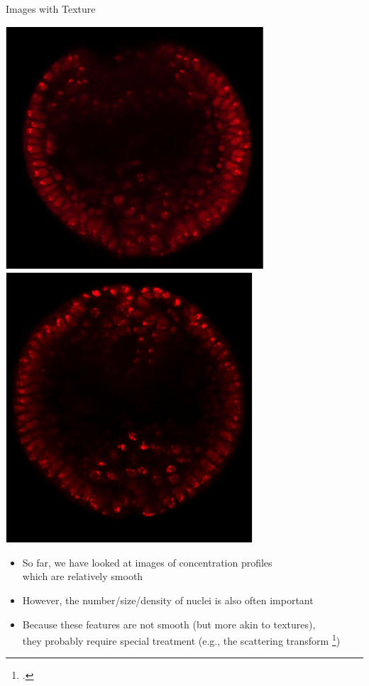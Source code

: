 \documentclass[10pt]{beamer}
\begin{document}
\begin{frame}{Images with Texture}
\begin{center}
\hspace{0.2in}
\includegraphics[width=\imwidth]{nuclei10}
\hspace{0.2in}
\includegraphics[width=\imwidth]{nuclei11}
\end{center}

\begin{itemize}
\item So far, we have looked at images of concentration profiles \\ which are relatively smooth
\item However, the number/size/density of nuclei is also often important
\item Because these features are not smooth (but more akin to textures), \\they probably require special treatment (e.g., the scattering transform \footcite{mallat2012group})
\end{itemize}
\end{frame}
\end{document}
